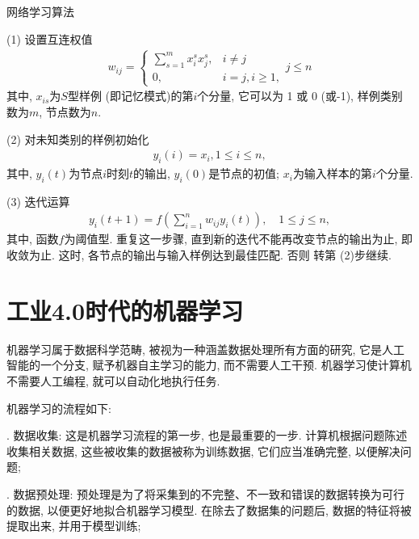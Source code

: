 网络学习算法
\begin{center}
\begin{minipage}{0.8\textwidth}
 (1) 设置互连权值
\begin{align}
    w_{i j}=\left\{
    \begin{array}{ll}
        \sum_{s=1}^{m} x_{i}^{s} x_{j}^{s}, & i \neq j \\
        0, & i=j, i \geq 1,
    \end{array}
    \right.j \leq n
\end{align}
其中, $x_{is}$为$S$型样例 (即记忆模式)的第$i$个分量, 它可以为 1 或 0 (或-1), 样例类别数为$m$, 节点数为$n$.

(2) 对未知类别的样例初始化
\begin{align}
    y_{i} (i)=x_{i}, 1 \leq i \leq n,
\end{align}
其中, $y_i (t)$为节点$i$时刻$t$的输出, $y_i (0)$是节点的初值; $x_i$为输入样本的第$i$个分量.
\end{minipage}
\end{center}
\begin{center}
\begin{minipage}{0.8\textwidth}


 (3) 迭代运算
\begin{align}
    y_{i} (t+1)=f\left (\sum_{i=1}^{n} w_{i j} y_{i} (t)\right), \quad 1 \leq j \leq n,
\end{align}
其中, 函数$f$为阈值型. 重复这一步骤, 直到新的迭代不能再改变节点的输出为止, 即收敛为止.
这时, 各节点的输出与输入样例达到最佳匹配. 否则 转第 (2)步继续.
\end{minipage}
\end{center}
\section{工业4.0时代的机器学习}

机器学习属于数据科学范畴, 被视为一种涵盖数据处理所有方面的研究, 它是人工智能的一个分支, 赋予机器自主学习的能力, 而不需要人工干预.
机器学习使计算机不需要人工编程, 就可以自动化地执行任务.

机器学习的流程如下:

. 数据收集: 这是机器学习流程的第一步, 也是最重要的一步. 计算机根据问题陈述收集相关数据, 这些被收集的数据被称为训练数据, 它们应当准确完整, 以便解决问题;

. 数据预处理: 预处理是为了将采集到的不完整、不一致和错误的数据转换为可行的数据, 以便更好地拟合机器学习模型. 在除去了数据集的问题后, 数据的特征将被提取出来, 并用于模型训练;

